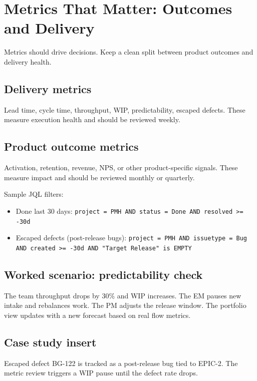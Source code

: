 \section{Metrics That Matter: Outcomes and Delivery}
Metrics should drive decisions. Keep a clean split between product outcomes and delivery health.

\subsection{Delivery metrics}
Lead time, cycle time, throughput, WIP, predictability, escaped defects. These measure execution health and should be reviewed weekly.

\subsection{Product outcome metrics}
Activation, retention, revenue, NPS, or other product-specific signals. These measure impact and should be reviewed monthly or quarterly.

Sample JQL filters:
\begin{itemize}
  \item Done last 30 days: \texttt{project = PMH AND status = Done AND resolved >= -30d}
  \item Escaped defects (post-release bugs): \texttt{project = PMH AND issuetype = Bug AND created >= -30d AND "Target Release" is EMPTY}
\end{itemize}

\subsection{Worked scenario: predictability check}
The team throughput drops by 30\% and WIP increases. The EM pauses new intake and rebalances work. The PM adjusts the release window. The portfolio view updates with a new forecast based on real flow metrics.

\subsection{Case study insert}
Escaped defect BG-122 is tracked as a post-release bug tied to EPIC-2. The metric review triggers a WIP pause until the defect rate drops.

